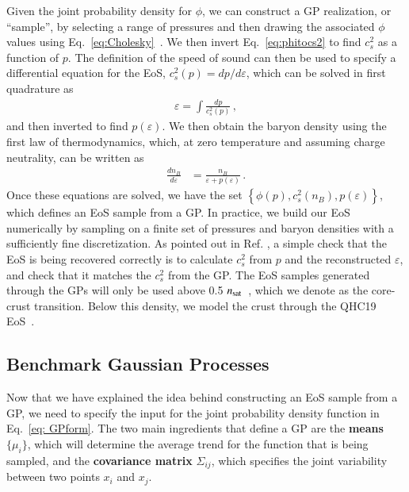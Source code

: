 \documentclass[aps,prd,nofootinbib,tightenlines,notitlepage,floatfix,superscriptaddress,showkeys,twocolumn]{revtex4-1}
\begin{document}
Given the joint probability density for $\phi$, we can construct a GP realization, or ``sample'', by selecting a range of pressures and then drawing the associated $\phi$ values using Eq.~\eqref{eq:Cholesky}~\cite{Reed:2021nqk}. We then invert Eq.~\eqref{eq:phitocs2} to find $c_s^2$ as a function of $p$. The definition of the speed of sound can then be used to specify a differential equation for the EoS, $c_s^2(p) = dp/d\varepsilon$, which can be solved in first quadrature as 
\begin{align}
    \varepsilon = \int \frac{dp}{c_s^2(p)}\,,
\end{align}
and then inverted to find $p(\varepsilon)$. We then obtain the baryon density using the first law of thermodynamics, which, at zero temperature and assuming charge neutrality, can be written as
\begin{align}
\frac{dn_B}{d\varepsilon}  &= \frac{n_B}{\varepsilon + p(\varepsilon)}  \,.  
\end{align}
Once these equations are solved, we have the set $\left\{\phi(p), c_s^2(n_B),p(\varepsilon)\right\}$, which defines an EoS sample from a GP. In practice, we build our EoS numerically by sampling on a finite set of pressures and baryon densities with a sufficiently fine discretization. As pointed out in Ref. \cite{Tan:2021ahl}, a simple check that the EoS is being recovered correctly is to calculate $c_s^2$ from $p$ and the reconstructed $\varepsilon$, and check that it matches the $c_s^2$ from the GP. The EoS samples generated through the GPs will only be used above 0.5 $n_{\rm sat}$~\cite{Hebeler:2013nza}, which we denote as the core-crust transition. Below this density, we model the crust through the QHC19 EoS~\cite{Baym:2019iky,Togashi:2017mjp}.


\subsection{Benchmark Gaussian Processes}  

Now that we have explained the idea behind constructing an EoS sample from a GP, we need to specify the input for the joint probability density function in Eq.~\eqref{eq: GPform}. The two main ingredients that define a GP are the {\bf means} $\{\mu_i\}$, which will determine the average trend for the function that is being sampled, and the {\bf covariance matrix} $\Sigma_{ij}$, which specifies the joint variability between two points $x_i$ and $x_j$.
\end{document}

